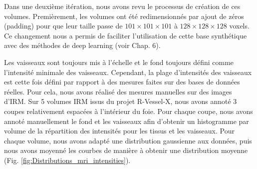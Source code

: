 Dans une deuxième itération, nous avons revu le processus de création de ces volumes. Premièrement, les volumes ont été redimensionnés par ajout de zéros (padding) pour que leur taille passe de $101 \times 101 \times 101$ à $128 \times 128 \times 128$ voxels. Ce changement nous a permis de faciliter l'utilisation de cette base synthétique avec des méthodes de deep learning (voir Chap. 6).

Les vaisseaux sont toujours mis à l'échelle et le fond toujours défini comme l'intensité minimale des vaisseaux. Cependant, la plage d'intensités des vaisseaux est cette fois défini par rapport à des mesures faites sur des bases de données réelles. Pour cela, nous avons réalisé des mesures manuelles sur des images d'IRM. Sur 5 volumes IRM issus du projet R-Vessel-X, nous avons annoté 3 coupes relativement espacées à l'intérieur du foie. Pour chaque coupe, nous avons annoté manuellement le fond et les vaisseaux afin d'obtenir un histogramme par volume de la répartition des intensités pour les tissus et les vaisseaux. Pour chaque volume, nous avons adapté une distribution gaussienne aux données, puis nous avons moyenné les courbes de manière à obtenir une distribution moyenne (Fig. \ref{fig:Distributions_mri_intensities}).

